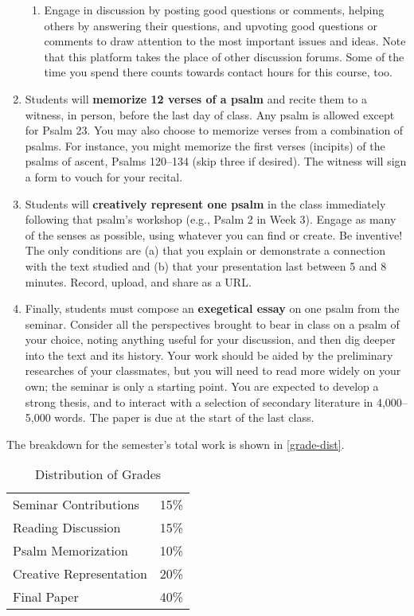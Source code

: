 \documentclass[titlepage]{article}
\begin{document}
\begin{enumerate}
\begin{enumerate}
		\item Engage in discussion by posting good questions or
		comments, helping others by answering their questions, and
		upvoting good questions or comments to draw attention to the
		most important issues and ideas. Note that this platform takes
		the place of other discussion forums. Some of the time you spend
		there counts towards contact hours for this course, too.

	\end{enumerate}

	\item Students will \textbf{memorize 12 verses of a psalm} and
	recite them to a witness, in person, before the last day of class.
	Any psalm is allowed except for Psalm 23. You may also choose to
	memorize verses from a combination of psalms. For instance, you
	might memorize the first verses (incipits) of the psalms of ascent,
	Psalms 120–134 (skip three if desired). The witness will sign a form
	to vouch for your recital.

	\item Students will \textbf{creatively represent one psalm} in the
	class immediately following that psalm’s workshop (e.g., Psalm 2 in
	Week 3). Engage as many of the senses as possible, using whatever
	you can find or create. Be inventive! The only conditions are (a)
	that you explain or demonstrate a connection with the text studied
	and (b) that your presentation last between 5 and 8 minutes. Record,
	upload, and share as a URL.

	\item Finally, students must compose an \textbf{exegetical essay} on
	one psalm from the seminar. Consider all the perspectives brought to
	bear in class on a psalm of your choice, noting anything useful for
	your discussion, and then dig deeper into the text and its history.
	Your work should be aided by the preliminary researches of your
	classmates, but you will need to read more widely on your own; the
	seminar is only a starting point. You are expected to develop a
	strong thesis, and to interact with a selection of secondary
	literature in 4,000--5,000 words. The paper is due at the start of
	the last class.

\end{enumerate}

The breakdown for the semester's total work is shown in
\autoref{grade-dist}.

\begin{table}[htbp]
  \centering
  {\lining
  \begin{tabular}{lr}
    \toprule
    Seminar Contributions   & 15\% \\
    Reading Discussion      & 15\% \\
    Psalm Memorization      & 10\% \\
    Creative Representation & 20\% \\
    Final Paper             & 40\% \\
    \bottomrule
  \end{tabular}}
  \caption{Distribution of Grades}
  \label{grade-dist}
\end{table}
\end{document}
